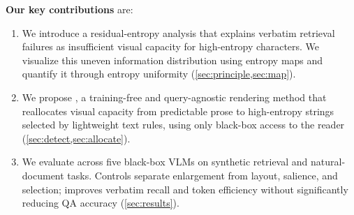 \textbf{Our key contributions} are:
\begin{enumerate}
  \item We introduce a residual-entropy analysis that explains verbatim retrieval failures as insufficient visual capacity for high-entropy characters. We visualize this uneven information distribution using entropy maps and quantify it through entropy uniformity (\cref{sec:principle,sec:map}).

  \item We propose \name, a training-free and query-agnostic rendering method that reallocates visual capacity from predictable prose to high-entropy strings selected by lightweight text rules, using only black-box access to the reader (\cref{sec:detect,sec:allocate}).

  \item We evaluate \name across five black-box VLMs on synthetic retrieval and natural-document tasks. Controls separate enlargement from layout, salience, and selection; \name improves verbatim recall and token efficiency without significantly reducing QA accuracy (\cref{sec:results}).
\end{enumerate}